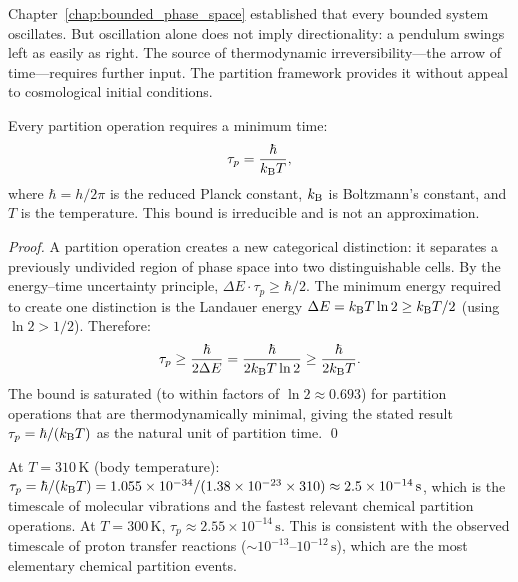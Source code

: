 Chapter~\ref{chap:bounded_phase_space} established that every bounded system
oscillates. But oscillation alone does not imply directionality: a pendulum
swings left as easily as right. The source of thermodynamic irreversibility---the
arrow of time---requires further input. The partition framework provides it
without appeal to cosmological initial conditions.

\begin{theorem}
\label{thm:partition_time}
Every partition operation requires a minimum time:
\begin{equation}
  \tau_p = \frac{\hbar}{k_{\mathrm{B}} T},
  \label{eq:partition_time}
\end{equation}
where $\hbar = h/2\pi$ is the reduced Planck constant, $k_{\mathrm{B}}$ is Boltzmann's
constant, and $T$ is the temperature. This bound is irreducible and is not
an approximation.
\end{theorem}

\begin{proof}
A partition operation creates a new categorical distinction: it separates a
previously undivided region of phase space into two distinguishable cells.
By the energy--time uncertainty principle,
$\Delta E \cdot \tau_p \geq \hbar/2$.
The minimum energy required to create one distinction is the
Landauer energy $\Delta E = k_{\mathrm{B}} T \ln 2 \geq k_{\mathrm{B}} T / 2$ (using $\ln 2 > 1/2$).
Therefore:
\begin{equation}
  \tau_p \geq \frac{\hbar}{2\Delta E} = \frac{\hbar}{2k_{\mathrm{B}} T \ln 2}
          \geq \frac{\hbar}{2k_{\mathrm{B}} T}.
\end{equation}
The bound is saturated (to within factors of $\ln 2 \approx 0.693$) for
partition operations that are thermodynamically minimal, giving the stated
result $\tau_p = \hbar/(k_{\mathrm{B}} T)$ as the natural unit of partition time. \qed
\end{proof}

\begin{remark}
At $T = 310\,\mathrm{K}$ (body temperature):
$\tau_p = \hbar/(k_{\mathrm{B}} T) = 1.055\times10^{-34} / (1.38\times10^{-23} \times 310)
\approx 2.5\times10^{-14}\,\mathrm{s}$,
which is the timescale of molecular vibrations and the fastest relevant
chemical partition operations. At $T = 300\,\mathrm{K}$, $\tau_p \approx 2.55\times10^{-14}\,\mathrm{s}$.
This is consistent with the observed timescale of proton transfer reactions
($\sim 10^{-13}$--$10^{-12}\,\mathrm{s}$), which are the most elementary
chemical partition events.
\end{remark}

